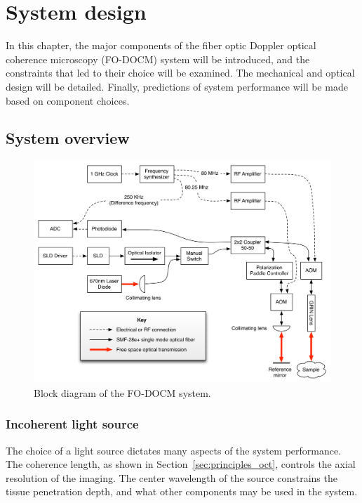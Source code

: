 \chapter{System design}

In this chapter, the major components of the fiber optic Doppler optical coherence microscopy (FO-DOCM) system will be introduced, and the constraints that led to their choice will be examined. The mechanical and optical design will be detailed. Finally, predictions of system performance will be made based on component choices.

\section{System overview}

\begin{figure}[h!]
\centering
\includegraphics[width=1.0\textwidth]{Images/Background/actual_system_vertical.png}
\caption{Block diagram of the FO-DOCM system.}
\end{figure}

\subsection{Incoherent light source}

The choice of a light source dictates many aspects of the system performance. The coherence length, as shown in Section~\ref{sec:principles_oct}, controls the axial resolution of the imaging. The center wavelength of the source constrains the tissue penetration depth, and what other components may be used in the system.


